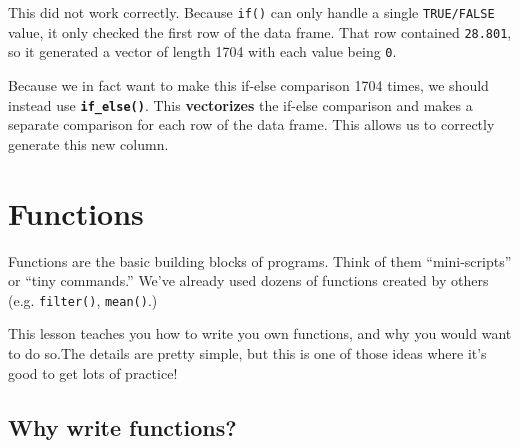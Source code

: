 \documentclass[]{book}
\newenvironment{Shaded}{\begin{snugshade}}{\end{snugshade}}
\newcommand{\KeywordTok}[1]{\textcolor[rgb]{0.13,0.29,0.53}{\textbf{#1}}}
\newcommand{\DataTypeTok}[1]{\textcolor[rgb]{0.13,0.29,0.53}{#1}}
\newcommand{\DecValTok}[1]{\textcolor[rgb]{0.00,0.00,0.81}{#1}}
\newcommand{\StringTok}[1]{\textcolor[rgb]{0.31,0.60,0.02}{#1}}
\newcommand{\CommentTok}[1]{\textcolor[rgb]{0.56,0.35,0.01}{\textit{#1}}}
\newcommand{\OperatorTok}[1]{\textcolor[rgb]{0.81,0.36,0.00}{\textbf{#1}}}
\newcommand{\NormalTok}[1]{#1}
\begin{document}
This did not work correctly. Because \texttt{if()} can only handle a
single \texttt{TRUE/FALSE} value, it only checked the first row of the
data frame. That row contained \texttt{28.801}, so it generated a vector
of length 1704 with each value being \texttt{0}.

Because we in fact want to make this if-else comparison 1704 times, we
should instead use \textbf{\texttt{if\_else()}}. This
\textbf{vectorizes} the if-else comparison and makes a separate
comparison for each row of the data frame. This allows us to correctly
generate this new column.

\begin{Shaded}
\end{Shaded}

\hypertarget{functions-1}{\section{Functions}\label{functions-1}}

Functions are the basic building blocks of programs. Think of them
``mini-scripts'' or ``tiny commands.'' We've already used dozens of
functions created by others (e.g. \texttt{filter()}, \texttt{mean()}.)

This lesson teaches you how to write you own functions, and why you
would want to do so.The details are pretty simple, but this is one of
those ideas where it's good to get lots of practice!

\subsection{Why write functions?}\label{why-write-functions}
\end{document}
